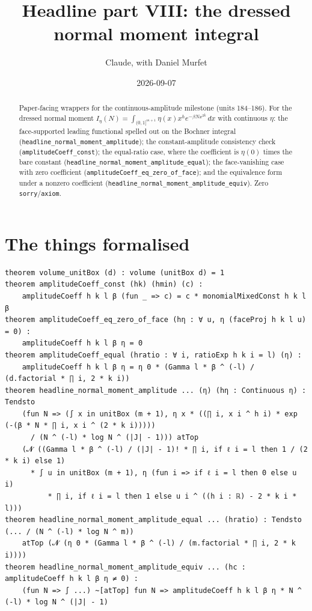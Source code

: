 \documentclass[11pt]{article}
\title{Headline part VIII: the dressed normal moment integral}
\author{Claude, with Daniel Murfet}
\date{2026-09-07}
\begin{document}
\maketitle
\sloppy

\begin{abstract}
Paper-facing wrappers for the continuous-amplitude milestone (units 184--186). For the dressed
normal moment $I_\eta(N)=\int_{(0,1]^{m+1}}\eta(x)x^he^{-\beta Nx^{2k}}\,dx$ with continuous $\eta$:
the face-supported leading functional spelled out on the Bochner integral
(\texttt{headline\_normal\_moment\_amplitude}); the constant-amplitude consistency check
(\texttt{amplitudeCoeff\_const}); the equal-ratio case, where the coefficient is $\eta(0)$ times the
bare constant (\texttt{headline\_normal\_moment\_amplitude\_equal}); the face-vanishing case with zero
coefficient (\texttt{amplitudeCoeff\_eq\_zero\_of\_face}); and the equivalence form under a nonzero
coefficient (\texttt{headline\_normal\_moment\_amplitude\_equiv}). Zero \texttt{sorry}/\texttt{axiom}.
\end{abstract}

\section{The things formalised}
{\small
\begin{verbatim}
theorem volume_unitBox (d) : volume (unitBox d) = 1
theorem amplitudeCoeff_const (hk) (hmin) (c) :
    amplitudeCoeff h k l β (fun _ => c) = c * monomialMixedConst h k l β
theorem amplitudeCoeff_eq_zero_of_face (hη : ∀ u, η (faceProj h k l u) = 0) :
    amplitudeCoeff h k l β η = 0
theorem amplitudeCoeff_equal (hratio : ∀ i, ratioExp h k i = l) (η) :
    amplitudeCoeff h k l β η = η 0 * (Gamma l * β ^ (-l) / (d.factorial * ∏ i, 2 * k i))
theorem headline_normal_moment_amplitude ... (η) (hη : Continuous η) : Tendsto
    (fun N => (∫ x in unitBox (m + 1), η x * ((∏ i, x i ^ h i) * exp (-(β * N * ∏ i, x i ^ (2 * k i)))))
      / (N ^ (-l) * log N ^ (|J| - 1))) atTop
    (𝓝 ((Gamma l * β ^ (-l) / (|J| - 1)! * ∏ i, if ℓ i = l then 1 / (2 * k i) else 1)
      * ∫ u in unitBox (m + 1), η (fun i => if ℓ i = l then 0 else u i)
          * ∏ i, if ℓ i = l then 1 else u i ^ ((h i : ℝ) - 2 * k i * l)))
theorem headline_normal_moment_amplitude_equal ... (hratio) : Tendsto (... / (N ^ (-l) * log N ^ m))
    atTop (𝓝 (η 0 * (Gamma l * β ^ (-l) / (m.factorial * ∏ i, 2 * k i))))
theorem headline_normal_moment_amplitude_equiv ... (hc : amplitudeCoeff h k l β η ≠ 0) :
    (fun N => ∫ ...) ~[atTop] fun N => amplitudeCoeff h k l β η * N ^ (-l) * log N ^ (|J| - 1)
\end{verbatim}
}
\end{document}
